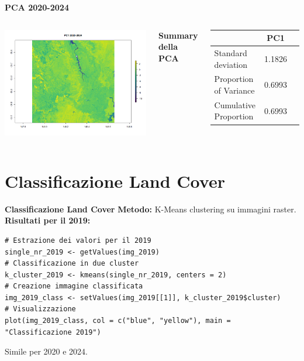 \documentclass{beamer}
\begin{document}
\begin{frame}{\textbf{PCA 2020-2024}}
\begin{columns}
    \centering
    \includegraphics[width=\textwidth]{PCA_PC1_2020_2024.png}
    
    \centering
    \textbf{Summary della PCA}
    \begin{table}
        \centering
        \begin{tabular}{lcc}
            \toprule
            & PC1 \\
            \midrule
            Standard deviation     & 1.1826 \\
            Proportion of Variance & 0.6993 \\
            Cumulative Proportion  & 0.6993 \\
            \bottomrule
        \end{tabular}
    \end{table}
\end{columns}
\end{frame}

\section{Classificazione Land Cover}

\begin{frame}[fragile]{\textbf{Classificazione Land Cover}}
\textbf{Metodo:} K-Means clustering su immagini raster.
\newline
\newline
\textbf{Risultati per il 2019:}
\begin{lstlisting}
# Estrazione dei valori per il 2019
single_nr_2019 <- getValues(img_2019)
# Classificazione in due cluster
k_cluster_2019 <- kmeans(single_nr_2019, centers = 2)
# Creazione immagine classificata
img_2019_class <- setValues(img_2019[[1]], k_cluster_2019$cluster)
# Visualizzazione
plot(img_2019_class, col = c("blue", "yellow"), main = "Classificazione 2019")
\end{lstlisting}
Simile per 2020 e 2024.
\end{frame}
\end{document}
